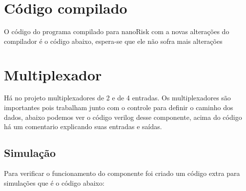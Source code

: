 \documentclass[a4paper, 10pt]{article}
\begin{document}
\section{Código compilado}
O código do programa compilado para nanoRisk com a novas alterações do compilador é o código abaixo, espera-se que ele não sofra mais alterações

\section{Multiplexador}
Há no projeto multiplexadores de 2 e de 4 entradas.
Os multiplexadores são importantes pois trabalham junto com o controle para definir o caminho dos dados, abaixo podemos ver o código verilog desse componente, acima do código há um comentario explicando suas entradas e saídas.

\subsection{Simulação}
Para verificar o funcionamento do componente foi criado um código extra para simulações que é o código abaixo:

\end{document}
